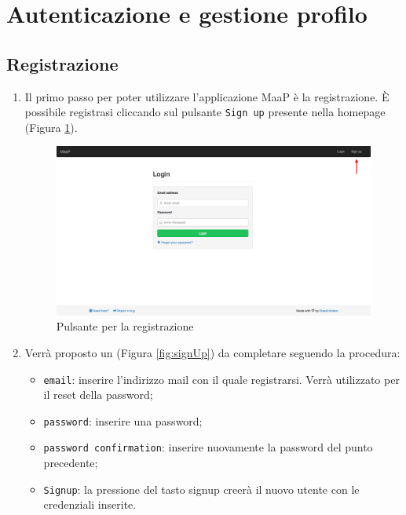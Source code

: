 \clearpage
\section{Autenticazione e gestione profilo}

	\subsection{Registrazione}
		\label{registrazione}

		\begin{enumerate}

			\item Il primo passo per poter utilizzare l'applicazione MaaP è la registrazione. \`E possibile registrasi cliccando sul pulsante \texttt{Sign up} presente nella homepage (Figura \ref{fig:signUpButton}).

			\begin{figure}[H]
				\centering \includegraphics[width=1\textwidth]{img/pulsanteSignUp.png}
			\caption{ \label{fig:signUpButton} Pulsante per la registrazione}
			\end{figure}

			\item Verrà proposto un  (Figura \ref{fig:signUp}) da completare seguendo la procedura:
				\begin{itemize}
					\item \texttt{email}: inserire l'indirizzo mail con il quale registrarsi. Verrà utilizzato per il reset della password;
					\item \texttt{password}: inserire una password;
					\item \texttt{password confirmation}: inserire nuovamente la password del punto precedente;
					\item \texttt{Signup}: la pressione del tasto signup creerà il nuovo utente con le credenziali inserite.
				\end{itemize}



\end{enumerate}
